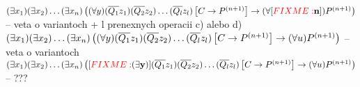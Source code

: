 \begin{dokaz}
\begin{itemize}
\begin{itemize}
            $ (\exists x_1) (\exists x_2) \dots (\exists x_n) \left( (\forall y) (\overline{Q_1} z_1)
                        (\overline{Q_2} z_2) \dots
                        (\overline{Q_l} z_l) \left[
                            C \rightarrow P^{(n+1)} \right]
                                \rightarrow (\forall [{\color{red} FIXME:} {\bf n}])
                                    P^{(n+1)} \right)$ -- veta o variantoch
                                    + l prenexnych operacii c) alebo d)
            $ (\exists x_1) (\exists x_2) \dots (\exists x_n) \left( (\forall y) (\overline{Q_1} z_1)
                        (\overline{Q_2} z_2) \dots
                        (\overline{Q_l} z_l) \left[
                            C \rightarrow P^{(n+1)} \right]
                                \rightarrow (\forall u)
                                    P^{(n+1)} \right)$ -- veta o variantoch
            $ (\exists x_1) (\exists x_2) \dots (\exists x_n) \left( [{\color{red} FIXME:} {\bf (\exists y)}] (\overline{Q_1} z_1)
                        (\overline{Q_2} z_2) \dots
                        (\overline{Q_l} z_l) \left[
                            C \rightarrow P^{(n+1)} \right]
                                \rightarrow (\forall u)
                                    P^{(n+1)} \right)$ -- ???

        \end{itemize}
    \end{itemize}
\end{dokaz}
